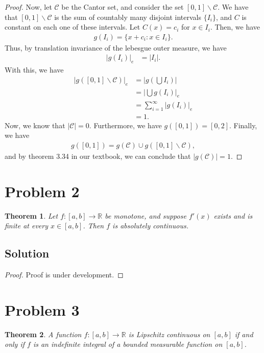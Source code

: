 \documentclass[10pt,a4paper]{article}
\theoremstyle{theorem}
\newtheorem{theorem}{Theorem}
\theoremstyle{definition}
\begin{document}
\begin{proof}
Now, let $\mathcal{C}$ be the Cantor set, and consider the set $[0, 1]\backslash \mathcal{C}$. We have that $[0, 1]\backslash \mathcal{C}$ is the sum of countably many disjoint intervals $\{I_i\}$, and $C$ is constant on each one of these intervals. Let $C(x) = c_i$ for $x \in I_i$. Then, we have
\begin{align*}
g(I_i) = \{x + c_i: x \in I_i \}.
\end{align*}
Thus, by translation invariance of the lebesgue outer measure, we have
\begin{align*}
|g(I_i)|_e &= |I_i|.
\end{align*}
With this, we have
\begin{align*}
|g([0, 1]\backslash \mathcal{C})|_e &= \left| g \left(\bigcup I_i \right) \right|\\
&= \left| \bigcup g(I_i) \right|_e\\
&= \sum_{i=1}^\infty |g(I_i)|_e\\
&= 1.
\end{align*}
Now, we know that $|\mathcal{C}| = 0$. Furthermore, we have $g([0, 1]) = [0, 2]$. Finally, we have
\begin{align*}
g([0, 1]) = g(\mathcal{C}) \cup g([0, 1]\backslash \mathcal{C}),
\end{align*}
and by theorem 3.34 in our textbook, we can conclude that $|g(\mathcal{C})| = 1$.
\end{proof}

\section*{Problem 2}
\begin{theorem}
Let $f:[a, b] \to \mathbb{R}$ be monotone, and suppose $f'(x)$ exists and is finite at every $x \in [a, b]$. Then $f$ is absolutely continuous. 
\end{theorem}

\subsection*{Solution}
\begin{proof}
Proof is under development.
\end{proof}

\section*{Problem 3}
\begin{theorem}
A function $f:[a, b] \to \mathbb{R}$ is Lipschitz continuous on $[a, b]$ if and only if $f$ is an indefinite integral of a bounded measurable function on $[a, b]$.
\end{theorem}
\end{document}
